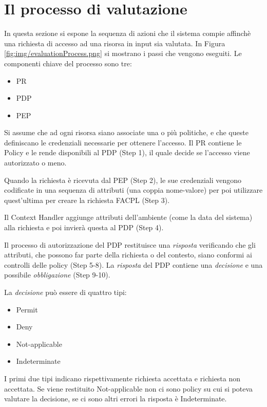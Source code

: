 \section{Il processo di valutazione}
\label{sec:Il processo di valutazione Facpl}
In questa sezione si espone la sequenza di azioni che il sistema compie affinchè una richiesta
di accesso ad una risorsa in input sia valutata.
In Figura \ref{fig:img/evaluationProcess.png} si mostrano i passi che vengono eseguiti.
Le componenti chiave del processo sono tre:
\begin{itemize}
  \renewcommand\labelitemi{--}
  \item \ac{PR}
  \item \acf{PDP}
  \item \acf{PEP}
\end{itemize}
Si assume che ad ogni risorsa siano associate una o più politiche, e che queste definiscano le credenziali
necessarie per ottenere l'accesso. Il \ac{PR} contiene le Policy e le rende disponibili al \ac{PDP} (Step 1), il
quale decide se l'accesso viene autorizzato o meno. \par
Quando la richiesta è ricevuta dal \ac{PEP} (Step 2), le sue credenziali vengono codificate in una sequenza
di attributi (una coppia nome-valore) per poi utilizzare quest'ultima per creare la richiesta \ac{FACPL} (Step 3).\par
Il Context Handler aggiunge attributi dell'ambiente (come la data del sistema) alla richiesta e
poi invierà questa al \ac{PDP} (Step 4).\par
Il processo di autorizzazione del \ac{PDP} restituisce una \emph{risposta} verificando che gli attributi, che possono far
parte della richiesta o del contesto, siano conformi ai controlli delle policy (Step 5-8). La \emph{risposta} del \ac{PDP}
contiene una \emph{decisione} e una possibile \emph{obbligazione} (Step 9-10).\par
La \emph{decisione} può essere di quattro tipi:
\begin{itemize}
  \renewcommand\labelitemi{--}
  \item Permit
  \item Deny
  \item Not-applicable
  \item Indeterminate
\end{itemize}
I primi due tipi indicano rispettivamente richiesta accettata e richiesta non accettata. Se viene restituito Not-applicable
non ci sono policy su cui si poteva valutare la decisione, se ci sono altri errori la risposta è Indeterminate.
